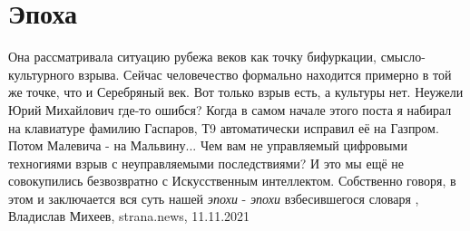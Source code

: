  
 
 
 
 
\chapter{Эпоха}

Она рассматривала ситуацию рубежа веков как точку бифуркации,
смысло-культурного взрыва.  Сейчас человечество формально находится примерно в
той же точке, что и Серебряный век.  Вот только взрыв есть, а культуры нет.
Неужели Юрий Михайлович где-то ошибся?  Когда в самом начале этого поста я
набирал на клавиатуре фамилию Гаспаров, Т9 автоматически исправил её на
Газпром.  Потом Малевича - на Мальвину...  Чем вам не управляемый цифровыми
техногиями взрыв с неуправляемыми последствиями?  И это мы ещё не совокупились
безвозвратно с Искусственным интеллектом.  Собственно говоря, в этом и
заключается вся суть нашей \emph{эпохи} - \emph{эпохи} взбесившегося словаря
, 
Владислав Михеев, strana.news, 11.11.2021
